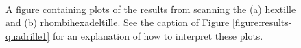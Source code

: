 \documentclass[12pt]{amsbook}
\theoremstyle{plain}
\theoremstyle{definition}
\theoremstyle{remark}
\begin{document}
\begin{figure}
\centering
{} \\
\caption{
\label{figure:results-hextille1}
A figure containing plots of the results from scanning the (a) hextille and (b) rhombihexadeltille.  See the caption of Figure \ref{figure:results-quadrille1} for an explanation of how to interpret these plots.
}
\end{figure}
\end{document}
